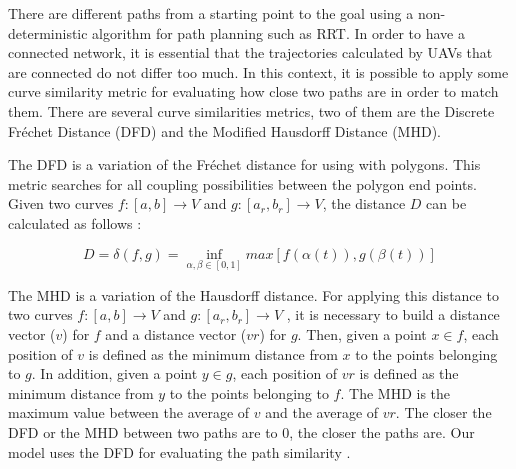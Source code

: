 There are different paths from a starting point to the goal using a non-deterministic algorithm for path planning such as RRT. In order to have a connected network, it is essential that the trajectories calculated by UAVs that are connected do not differ too much. In this context, it is possible to apply some curve similarity metric for evaluating how close two paths are in order to match them. There are several curve similarities metrics, two of them are the  Discrete Fr{\'e}chet Distance (DFD) and the Modified Hausdorff Distance (MHD).

The DFD is a variation of the Fr{\'e}chet distance for using with polygons. This metric searches for all coupling possibilities between the polygon end points. Given two curves $f:[a, b] \rightarrow V $ and $g:[a_r, b_r] \rightarrow V$, the distance $D$ can be calculated as follows \cite{eiter_1994}: 

\begin{equation}
D = \delta(f,g) = \inf_{\alpha, \beta \in [0,1]} max[f(\alpha(t)), g(\beta(t))]
\end{equation}

The MHD is a variation of the Hausdorff distance. For applying this distance to two curves $f:[a, b] \rightarrow V $ and $g:[a_r, b_r] \rightarrow V$ , it is necessary to build a distance vector ($v$) for $f$ and a distance vector ($vr$) for $g$. Then, given a point $x \in f$, each position of $v$ is defined as the minimum distance from $x$ to the points belonging to $g$. In addition, given a point $y \in g$, each position of $vr$ is defined as the minimum distance from $y$ to the points belonging to $f$. The MHD is the maximum value between the average of $v$ and the average of $vr$. The closer the DFD or the MHD between two paths are to 0, the closer the paths are.  Our model uses the DFD for evaluating the path similarity \cite{dubuisson_1994}.

